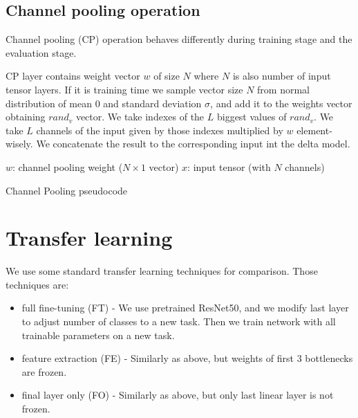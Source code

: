 \documentclass[12pt]{article}
\begin{document}
    \subsection{Channel pooling operation}

    Channel pooling (CP) operation behaves differently during training stage and the evaluation stage.

    CP layer contains weight vector $w$ of size $N$ where $N$ is also number of input tensor layers.
    If it is training time we sample vector size $N$ from normal distribution of mean 0 and standard deviation $\sigma$, and add it to the weights vector obtaining $rand_v$ vector.
    We take indexes of the $L$ biggest values of $rand_v$.
    We take $L$ channels of the input given by those indexes multiplied by $w$ element-wisely.
    We concatenate the result to the corresponding input int the delta model.

    \begin{algorithm}
        $w$: channel pooling weight ($N\times1$ vector)\;
        $x$: input tensor (with $N$ channels)\;
        \caption{Channel Pooling pseudocode}\label{alg:algorithm}
    \end{algorithm}


    \section{Transfer learning}

    We use some standard transfer learning techniques for comparison.
    Those techniques are:
    \begin{itemize}
        \item full fine-tuning (FT) - We use pretrained ResNet50, and we modify last layer to adjust number of classes to a new task. Then we train network with all trainable parameters on a new task.
        \item feature extraction (FE) - Similarly as above, but weights of first 3 bottlenecks are frozen.
        \item final layer only (FO) - Similarly as above, but only last linear layer is not frozen.
    \end{itemize}
\end{document}
